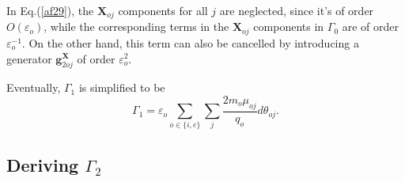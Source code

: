 \documentclass[12pt]{iopart}
\begin{document}
In Eq.(\ref{af29}), the $\mathbf{X}_{oj}$ components for all $j$ are neglected, since it's of order $O(\varepsilon_o)$, while the corresponding terms in the $\mathbf{X}_{oj}$ components in $\Gamma_0$ are of order $\varepsilon_o^{-1}$. On the other hand, this term can also be cancelled by introducing a generator $\mathbf{g}_{2oj}^{\mathbf{X}}$ of order $\varepsilon_{o}^2$.

Eventually, $\Gamma_1$ is simplified to be
\begin{equation}\label{af30}
{\Gamma _1} = {\varepsilon _o}\sum\limits_{o \in \{ i,e\} } {\sum\limits_j {\frac{{2{m_o}{\mu _{oj}}}}{{{q_o}}}d{\theta _{oj}}} }.
\end{equation}

\subsection{Deriving $\Gamma_2$}
\end{document}
